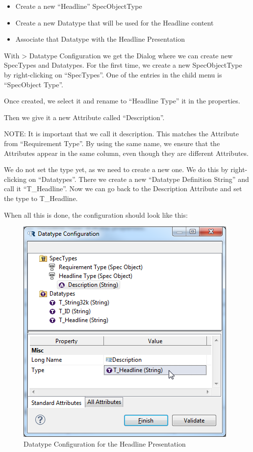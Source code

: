 \begin{itemize}

\item
  Create a new ``Headline'' SpecObjectType
\item
  Create a new Datatype that will be used for the Headline content
\item
  Associate that Datatype with the Headline Presentation
\end{itemize}

With \pror{} \textgreater{} Datatype Configuration we get the Dialog where
we can create new SpecTypes and Datatypes. For the first time, we create
a new SpecObjectType by right-clicking on ``SpecTypes''. One of the
entries in the child menu is ``SpecObject Type''.

Once created, we select it and rename to ``Headline Type'' it in the
properties.

Then we give it a new Attribute called ``Description''.

NOTE: It is important that we call it description. This matches the
Attribute from ``Requirement Type''. By using the same name, we ensure
that the Attributes appear in the same column, even though they are
different Attributes.

We do not set the type yet, as we need to create a new one. We do this
by right-clicking on ``Datatypes''. There we create a new ``Datatype
Definition String'' and call it ``T\_Headline''. Now we can go back to
the Description Attribute and set the type to T\_Headline.

When all this is done, the configuration should look like this:

\begin{figure}[h!]
\centering      
\includegraphics[width=0.8\linewidth]{../rmf-images/pror_datatype_headline1.png}      
\caption{Datatype Configuration for the Headline Presentation}      
\label{fig:headlineConfig}
\end{figure}

